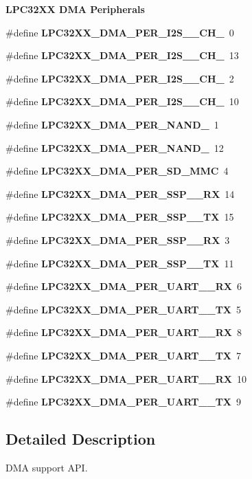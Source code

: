 \begin{Indent}\textbf{ L\+P\+C32\+XX D\+MA Peripherals}\par
\begin{DoxyCompactItemize}
\item 
\#define {\bfseries L\+P\+C32\+X\+X\+\_\+\+D\+M\+A\+\_\+\+P\+E\+R\+\_\+\+I2\+S\+\_\+\_\+\+C\+H\+\_}~0
\item 
\#define {\bfseries L\+P\+C32\+X\+X\+\_\+\+D\+M\+A\+\_\+\+P\+E\+R\+\_\+\+I2\+S\+\_\+\_\+\+C\+H\+\_}~13
\item 
\#define {\bfseries L\+P\+C32\+X\+X\+\_\+\+D\+M\+A\+\_\+\+P\+E\+R\+\_\+\+I2\+S\+\_\+\_\+\+C\+H\+\_}~2
\item 
\#define {\bfseries L\+P\+C32\+X\+X\+\_\+\+D\+M\+A\+\_\+\+P\+E\+R\+\_\+\+I2\+S\+\_\+\_\+\+C\+H\+\_}~10
\item 
\#define {\bfseries L\+P\+C32\+X\+X\+\_\+\+D\+M\+A\+\_\+\+P\+E\+R\+\_\+\+N\+A\+N\+D\+\_}~1
\item 
\#define {\bfseries L\+P\+C32\+X\+X\+\_\+\+D\+M\+A\+\_\+\+P\+E\+R\+\_\+\+N\+A\+N\+D\+\_}~12
\item 
\#define {\bfseries L\+P\+C32\+X\+X\+\_\+\+D\+M\+A\+\_\+\+P\+E\+R\+\_\+\+S\+D\+\_\+\+M\+MC}~4
\item 
\#define {\bfseries L\+P\+C32\+X\+X\+\_\+\+D\+M\+A\+\_\+\+P\+E\+R\+\_\+\+S\+S\+P\+\_\+\_\+\+RX}~14
\item 
\#define {\bfseries L\+P\+C32\+X\+X\+\_\+\+D\+M\+A\+\_\+\+P\+E\+R\+\_\+\+S\+S\+P\+\_\+\_\+\+TX}~15
\item 
\#define {\bfseries L\+P\+C32\+X\+X\+\_\+\+D\+M\+A\+\_\+\+P\+E\+R\+\_\+\+S\+S\+P\+\_\+\_\+\+RX}~3
\item 
\#define {\bfseries L\+P\+C32\+X\+X\+\_\+\+D\+M\+A\+\_\+\+P\+E\+R\+\_\+\+S\+S\+P\+\_\+\_\+\+TX}~11
\item 
\#define {\bfseries L\+P\+C32\+X\+X\+\_\+\+D\+M\+A\+\_\+\+P\+E\+R\+\_\+\+U\+A\+R\+T\+\_\+\_\+\+RX}~6
\item 
\#define {\bfseries L\+P\+C32\+X\+X\+\_\+\+D\+M\+A\+\_\+\+P\+E\+R\+\_\+\+U\+A\+R\+T\+\_\+\_\+\+TX}~5
\item 
\#define {\bfseries L\+P\+C32\+X\+X\+\_\+\+D\+M\+A\+\_\+\+P\+E\+R\+\_\+\+U\+A\+R\+T\+\_\+\_\+\+RX}~8
\item 
\#define {\bfseries L\+P\+C32\+X\+X\+\_\+\+D\+M\+A\+\_\+\+P\+E\+R\+\_\+\+U\+A\+R\+T\+\_\+\_\+\+TX}~7
\item 
\#define {\bfseries L\+P\+C32\+X\+X\+\_\+\+D\+M\+A\+\_\+\+P\+E\+R\+\_\+\+U\+A\+R\+T\+\_\+\_\+\+RX}~10
\item 
\#define {\bfseries L\+P\+C32\+X\+X\+\_\+\+D\+M\+A\+\_\+\+P\+E\+R\+\_\+\+U\+A\+R\+T\+\_\+\_\+\+TX}~9
\end{DoxyCompactItemize}
\end{Indent}


\subsection{Detailed Description}
D\+MA support A\+PI. 

